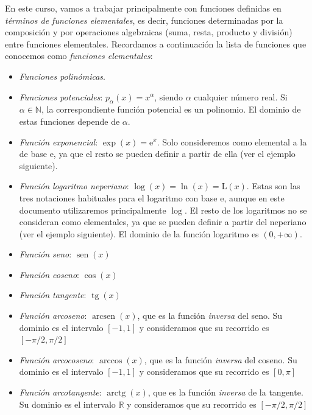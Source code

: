 En este curso, vamos a trabajar principalmente con funciones definidas en \emph{términos de funciones elementales}, es decir, funciones determinadas por la composición y por operaciones algebraicas (suma, resta, producto y división) entre funciones elementales.
Recordamos a continuación la lista de funciones que conocemos como \emph{funciones elementales}:
%
\begin{itemize}
\item
\emph{Funciones polinómicas}.
\item
\emph{Funciones potenciales}: $p_\alpha(x)=x^\alpha$, siendo $\alpha$ cualquier número real. Si $\alpha\in\mathbb{N}$, la correspondiente función potencial es un polinomio. El dominio de estas funciones depende de $\alpha$.
\item
\emph{Función exponencial}: $\exp(x)=\mathrm{e}^x$. Solo consideremos como elemental a la de base e, ya que el resto se pueden definir a partir de ella (ver el ejemplo siguiente).
\item
\emph{Función logaritmo neperiano}: $\log(x)=\ln(x)=\mathrm{L}(x)$.
Estas son las tres notaciones habituales para el logaritmo con base e, aunque en este documento utilizaremos principalmente $\log$. El resto de los logaritmos no se consideran como elementales, ya que se pueden definir a partir del neperiano (ver el ejemplo siguiente).
El dominio de la función logaritmo es $(0,+\infty)$.
\item
\emph{Función seno}: $\operatorname{sen}(x)$

\item
\emph{Función coseno}: $\cos(x)$

\item
\emph{Función tangente}: $\operatorname{tg}(x)$

\item
\emph{Función arcoseno}: $\operatorname{arcsen}(x)$, que es la función \emph{inversa} del seno.
Su dominio es el intervalo $[-1,1]$ y consideramos que su recorrido es $[-\pi/2,\pi/2]$

\item
\emph{Función arcocoseno}: $\arccos(x)$, que es la función \emph{inversa} del coseno.
Su dominio es el intervalo $[-1,1]$ y consideramos que su recorrido es $[0,\pi]$

\item
\emph{Función arcotangente}: $\operatorname{arctg}(x)$, que es la función \emph{inversa} de la tangente.
Su dominio es el intervalo $\mathbb{R}$ y consideramos que su recorrido es $[-\pi/2,\pi/2]$
\end{itemize}


